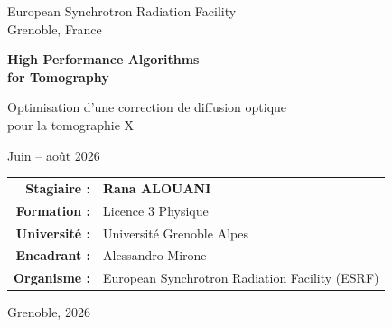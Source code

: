\documentclass[11pt,a4paper]{report}
\begin{document}

\begin{titlepage}

\centering

{\Large European Synchrotron Radiation Facility}\\[0.4cm]
{\large Grenoble, France}

\vfill

{\Huge\bfseries High Performance Algorithms\\
for Tomography}

\vspace{0.7cm}

{\Large Optimisation d'une correction de diffusion optique\\
pour la tomographie X}


\vspace{0.5cm}

{\large Juin -- août 2026}

\vfill

\vspace{1.2cm}

\begin{center}

\begin{tabular}{rl}

\textbf{Stagiaire :} &
{\Large\bfseries Rana ALOUANI}
\\[0.35cm]

\textbf{Formation :} &
Licence 3 Physique
\\[0.25cm]

\textbf{Université :} &
Université Grenoble Alpes
\\[0.8cm]

\textbf{Encadrant :} &
Alessandro Mirone
\\[0.25cm]

\textbf{Organisme :} &
European Synchrotron Radiation Facility (ESRF)

\end{tabular}

\end{center}

\vfill

Grenoble, 2026

\end{titlepage}

\end{document}
